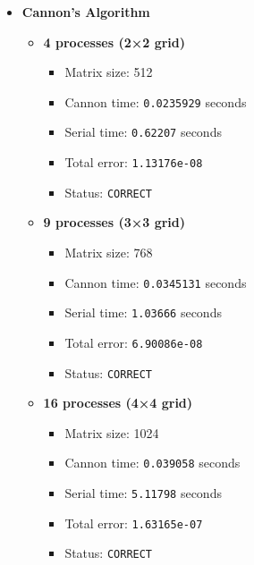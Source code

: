 \documentclass[11pt]{article}
\begin{document}
\begin{itemize}
\begin{itemize}
    \item \textbf{Cannon's Algorithm}
    \begin{itemize}
        \item \textbf{4 processes (2×2 grid)}  
              \begin{itemize}
                  \item Matrix size: 512
                  \item Cannon time: \texttt{0.0235929} seconds
                  \item Serial time: \texttt{0.62207} seconds
                  \item Total error: \texttt{1.13176e-08}
                  \item Status: \texttt{CORRECT}
              \end{itemize}
        \item \textbf{9 processes (3×3 grid)}  
              \begin{itemize}
                  \item Matrix size: 768
                  \item Cannon time: \texttt{0.0345131} seconds
                  \item Serial time: \texttt{1.03666} seconds
                  \item Total error: \texttt{6.90086e-08}
                  \item Status: \texttt{CORRECT}
              \end{itemize}
        \item \textbf{16 processes (4×4 grid)}  
              \begin{itemize}
                  \item Matrix size: 1024
                  \item Cannon time: \texttt{0.039058} seconds
                  \item Serial time: \texttt{5.11798} seconds
                  \item Total error: \texttt{1.63165e-07}
                  \item Status: \texttt{CORRECT}
              \end{itemize}
    \end{itemize}
\end{itemize}

\end{itemize}
\end{document}
